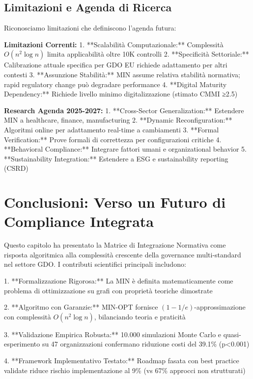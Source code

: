 \subsection{Limitazioni e Agenda di Ricerca}

Riconosciamo limitazioni che definiscono l'agenda futura:

\textbf{Limitazioni Correnti:}
1. **Scalabilità Computazionale:** Complessità $O(n^2 \log n)$ limita applicabilità oltre 10K controlli
2. **Specificità Settoriale:** Calibrazione attuale specifica per GDO EU richiede adattamento per altri contesti
3. **Assunzione Stabilità:** MIN assume relativa stabilità normativa; rapid regulatory change può degradare performance
4. **Digital Maturity Dependency:** Richiede livello minimo digitalizzazione (stimato CMMI ≥2.5)

\textbf{Research Agenda 2025-2027:}
1. **Cross-Sector Generalization:** Estendere MIN a healthcare, finance, manufacturing
2. **Dynamic Reconfiguration:** Algoritmi online per adattamento real-time a cambiamenti
3. **Formal Verification:** Prove formali di correttezza per configurazioni critiche
4. **Behavioral Compliance:** Integrare fattori umani e organizational behavior
5. **Sustainability Integration:** Estendere a ESG e sustainability reporting (CSRD)

\section{Conclusioni: Verso un Futuro di Compliance Integrata}

Questo capitolo ha presentato la Matrice di Integrazione Normativa come risposta algoritmica alla complessità crescente della governance multi-standard nel settore GDO. I contributi scientifici principali includono:

1. **Formalizzazione Rigorosa:** La MIN è definita matematicamente come problema di ottimizzazione su grafi con proprietà teoriche dimostrate

2. **Algoritmo con Garanzie:** MIN-OPT fornisce $(1-1/e)$-approssimazione con complessità $O(n^2 \log n)$, bilanciando teoria e praticità

3. **Validazione Empirica Robusta:** 10.000 simulazioni Monte Carlo e quasi-esperimento su 47 organizzazioni confermano riduzione costi del 39.1\% (p<0.001)

4. **Framework Implementativo Testato:** Roadmap fasata con best practice validate riduce rischio implementazione al 9\% (vs 67\% approcci non strutturati)

